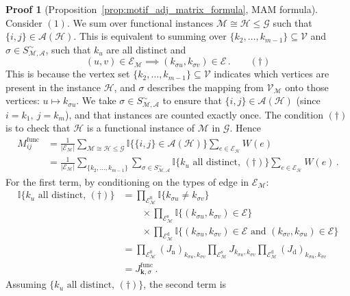 \documentclass[12pt,draft]{ociamthesis}
\theoremstyle{plain}
\theoremstyle{definition}
\newtheorem{prf}{Proof}[chapter]
\theoremstyle{remark}
\newcommand\bb[1]{\mathbb{#1}}
\newcommand\ca[1]{\mathcal{#1}}
\begin{document}
\begin{prf}[Proposition~\ref{prop:motif_adj_matrix_formula}, MAM formula]
\label{proof:motif_adj_matrix_formula}
%
Consider $(1)$. We sum over functional instances $\ca{M} \cong \ca{H} \leq
\ca{G}$ such that $\{i,j\} \in \ca{A(H)}$.
This is equivalent to summing over $\{k_2, \ldots, k_{m-1}\} \subseteq
\ca{V}$ and $\sigma \in S_\ca{M,A}^\sim$, such that $k_u$ are all distinct
and
%
$$ (u,v) \in \ca{E_M} \implies (k_{\sigma u}, k_{\sigma v}) \in \ca{E}\,.
\qquad (\dagger) $$
%
This is because the vertex set $\{k_2, \ldots, k_{m-1}\} \subseteq \ca{V}$
indicates which vertices are present in the instance $\ca{H}$, and $\sigma$
describes the mapping from $\ca{V_M}$ onto those vertices: $u \mapsto
k_{\sigma u}$. We take $\sigma \in S_\ca{M,A}^\sim$ to ensure that $\{i,j\}
\in \ca{A(H)}$ (since $i=k_1, \ j=k_m$), and that instances are counted
exactly once.
The condition $(\dagger)$ is to check that $\ca{H}$ is a functional instance
of $\ca{M}$ in $\ca{G}$. Hence
%
\begin{align*}
M^\mathrm{func}_{i j} &= \frac{1}{|\ca{E_M}|}
\sum_{\ca{M} \cong \ca{H} \leq
\ca{G}} \bb{I} \big\{ \{i,j\} \in \ca{A}(\ca{H}) \big\} \sum_{e \in
\ca{E_H}} W(e) \\
%
&=  \frac{1}{|\ca{E_M}|} \sum_{\{ k_2, \ldots, k_{m-1} \}} \sum_{\sigma \in
S_\ca{M,A}^\sim} \bb{I} \big\{ k_u \textrm{ all distinct}, \, (\dagger)
\big\} \sum_{e \in \ca{E_H}} W(e)\,.
\end{align*}
%
For the first term, by conditioning on the types of edge in $\ca{E_M}$:
\begin{align*}
%
\bb{I} \big\{ k_u \textrm{ all distinct}, \, (\dagger) \big\}
&= \prod_{\ca{E}_\ca{M}^0} \bb{I} \{ k_{\sigma u} \neq k_{\sigma v} \} \\
& \qquad \times \prod_{\ca{E}_\ca{M}^\mathrm{s}} \bb{I} \{ (k_{\sigma u},
k_{\sigma v}) \in \ca{E} \} \\
& \qquad \times \prod_{\ca{E}_\ca{M}^\mathrm{d}} \bb{I} \{(k_{\sigma u},
k_{\sigma v}) \in \ca{E} \textrm{ and } (k_{\sigma v}, k_{\sigma u}) \in
\ca{E}\} \\
%
&= \prod_{\ca{E}_\ca{M}^0} (J_\mathrm{n})_{k_{\sigma u},k_{\sigma v}}
\prod_{\ca{E}_\ca{M}^\mathrm{s}} J_{k_{\sigma u},k_{\sigma v}}
\prod_{\ca{E}_\ca{M}^\mathrm{d}} (J_\mathrm{d})_{k_{\sigma u},k_{\sigma v}}
\\
%
&= J^\mathrm{func}_{\mathbf{k},\sigma}\,.
%
\end{align*}
%
Assuming $\big\{ k_u \textrm{ all distinct}, \, (\dagger) \big\}$, the second
term is

\end{prf}
\end{document}
